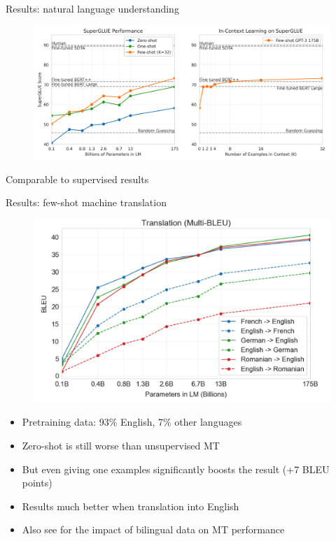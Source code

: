 \documentclass[usenames,dvipsnames,notes,11pt,aspectratio=169,hyperref={colorlinks=true, linkcolor=blue}]{beamer}
\begin{document}
\begin{frame}
    {Results: natural language understanding}
    \begin{figure}
        \includegraphics[width=\textwidth]{figures/gpt3-superglue}
    \end{figure}
    Comparable to supervised results
\end{frame}

\begin{frame}
    {Results: few-shot machine translation}
    \begin{figure}
        \includegraphics[height=0.6\textheight]{figures/gpt3-translation}
    \end{figure}
    \vspace{-2em}
    \begin{itemize}
        \item Pretraining data: 93\% English, 7\% other languages
        \item Zero-shot is still worse than unsupervised MT
        \item But even giving one examples significantly boosts the result (+7 BLEU points)
        \item Results much better when translation into English
        \item Also see  for the impact of bilingual data on MT performance
    \end{itemize}
\end{frame}
\end{document}

